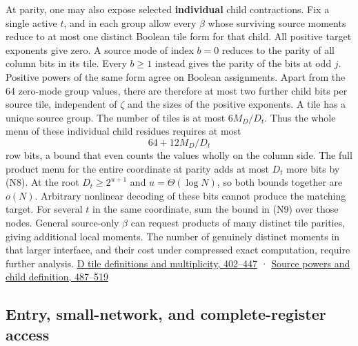 \documentclass[
  11pt,
]{article}
\begin{document}
At parity, one may also expose selected \textbf{individual} child
contractions. Fix a single active \(t\), and in each group allow every
\(\beta\) whose surviving source moments reduce to at most one distinct
Boolean tile form for that child. All positive target exponents give
zero. A source mode of index \(b=0\) reduces to the parity of all column
bits in its tile. Every \(b\ge1\) instead gives the parity of the bits
at odd \(j\). Positive powers of the same form agree on Boolean
assignments. Apart from the 64 zero-mode group values, there are
therefore at most two further child bits per source tile, independent of
\(\zeta\) and the sizes of the positive exponents. A tile has a unique
source group. The number of tiles is at most \(6M_D/D_t\). Thus the
whole menu of these individual child residues requires at most \[
 64+12M_D/D_t
\tag{N9}
\] row bits, a bound that even counts the values wholly on the column
side. The full product menu for the entire coordinate at parity adds at
most \(D_t\) more bits by (N8). At the root \(D_t\ge 2^{u+1}\) and
\(u=\Theta(\log N)\), so both bounds together are \(o(N)\). Arbitrary
nonlinear decoding of these bits cannot produce the matching target. For
several \(t\) in the same coordinate, sum the bound in (N9) over those
nodes. General source-only \(\beta\) can request products of many
distinct tile parities, giving additional local moments. The number of
genuinely distinct moments in that larger interface, and their cost
under compressed exact computation, require further analysis.
\href{https://github.com/openai/math/blob/main/preprints/The-Exponential-Time-Hypothesis-is-False-October-25-2026/build/quantitative-contraction.tex\#L402}{D
tile definitions and multiplicity, 402--447} ·
\href{https://github.com/openai/math/blob/main/preprints/The-Exponential-Time-Hypothesis-is-False-October-25-2026/build/quantitative-contraction.tex\#L487}{Source
powers and child definition, 487--519}

\subsection{Entry, small-network, and complete-register
access}\label{v8-entry-small-network-and-complete-register-access}
\end{document}
